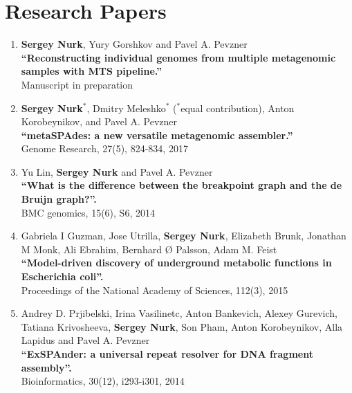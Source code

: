 \section{Research Papers}
%
\begin{enumerate}

\item
\textbf{Sergey Nurk}, Yury Gorshkov and Pavel A. Pevzner\\
\textbf{``Reconstructing individual genomes from multiple metagenomic samples with MTS pipeline.''}\\
Manuscript in preparation

\item 
\textbf{Sergey Nurk}$^*$, Dmitry Meleshko$^*$ ($^*$equal contribution), Anton Korobeynikov, and Pavel A. Pevzner \\
\textbf{``metaSPAdes: a new versatile metagenomic assembler.''} \\
Genome Research, 27(5), 824-834, 2017 

\item 
Yu Lin, \textbf{Sergey Nurk} and Pavel A. Pevzner\\
\textbf{``What is the difference between the breakpoint graph and the de Bruijn graph?''.} \\
BMC genomics, 15(6), S6, 2014

\item Gabriela I Guzman, Jose Utrilla, \textbf{Sergey Nurk}, Elizabeth Brunk, Jonathan M Monk, Ali Ebrahim, Bernhard Ø Palsson, Adam M. Feist\\
\textbf{``Model-driven discovery of underground metabolic functions in Escherichia coli''.} \\
Proceedings of the National Academy of Sciences, 112(3), 2015

\item Andrey D. Prjibelski, Irina Vasilinetc, Anton Bankevich, Alexey Gurevich, Tatiana Krivosheeva, \textbf{Sergey Nurk}, Son Pham, Anton Korobeynikov, Alla Lapidus and Pavel A. Pevzner\\
\textbf{``ExSPAnder: a universal repeat resolver for DNA fragment assembly''.} \\
Bioinformatics, 30(12), i293-i301, 2014


\end{enumerate}
